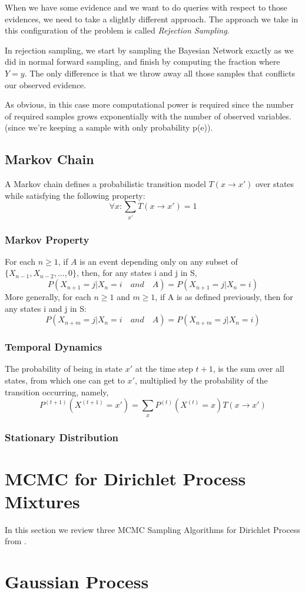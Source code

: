 \documentclass{article}
\begin{document}
    When we have some evidence and we want to do queries with respect to those evidences, we need to take a slightly different approach. The approach we take in this configuration of the problem is called \textit{Rejection Sampling}.

    In rejection sampling, we start by sampling the Bayesian Network exactly as we did in normal forward sampling, and finish by computing the fraction where $Y=y$. The only difference is that we throw away all those samples that conflicts our observed evidence.

    As obvious, in this case more computational power is required since the number of required samples grows exponentially with the number of observed variables. (since we're keeping a sample with only probability p(e)).

\subsection{Markov Chain}

A Markov chain defines a probabilistic transition model $T(x \rightarrow x')$ over states while satisfying the following property:
$$ \forall x: \sum_{x'} T(x \rightarrow x') = 1$$

\subsubsection{Markov Property}
    For each $n \geq 1$, if $A$ is an event depending only on any subset of $\{ X_{n-1}, X_{n-2}, \ldots, 0\}$, then, for any states i and j in S,
    $$ P(X_{n+1}=j|X_n=i \quad and \quad A) = P(X_{n+1} = j| X_n=i)$$
    More generally, for each $n \geq 1$ and $m \geq 1$, if A is as defined previously, then for any states i and j in S:
    $$ P(X_{n+m}=j|X_n=i \quad and \quad A) = P(X_{n+m}=j|X_n=i)$$

\subsubsection{Temporal Dynamics}
    The probability of being in state $x'$ at the time step $t+1$, is the sum over all states, from which one can get to $x'$, multiplied by the probability of the transition occurring, namely,
$$ P^{(t+1)}(X^{(t+1)} = x') = \sum_x P^{(t)}(X^{(t)} = x)T(x \rightarrow x')$$

\subsubsection{Stationary Distribution}

\section{MCMC for Dirichlet Process Mixtures }
In this section we review three MCMC Sampling Algorithms for Dirichlet Process from \cite{neal}.


\section{Gaussian Process}
\end{document}
